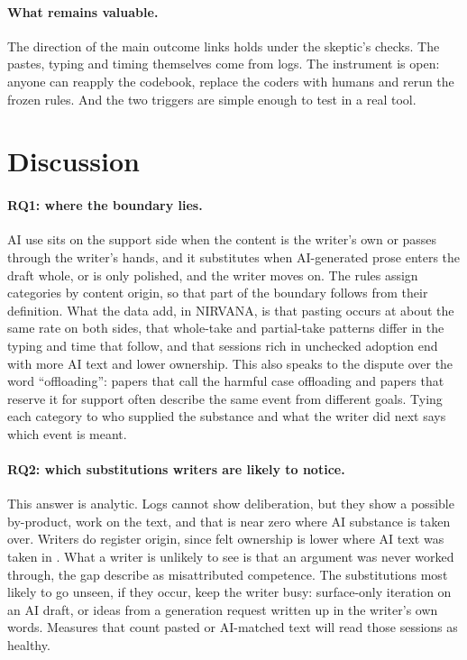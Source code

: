 \documentclass[manuscript,screen]{acmart}
\begin{document}
\paragraph{What remains valuable.} The direction of the main outcome links holds under the skeptic's checks. The pastes, typing and timing themselves come from logs. The instrument is open: anyone can reapply the codebook, replace the coders with humans and rerun the frozen rules. And the two triggers are simple enough to test in a real tool.

\section{Discussion}
\label{sec:discussion}

\paragraph{RQ1: where the boundary lies.} AI use sits on the support side when the content is the writer's own or passes through the writer's hands, and it substitutes when AI-generated prose enters the draft whole, or is only polished, and the writer moves on. The rules assign categories by content origin, so that part of the boundary follows from their definition. What the data add, in NIRVANA, is that pasting occurs at about the same rate on both sides, that whole-take and partial-take patterns differ in the typing and time that follow, and that sessions rich in unchecked adoption end with more AI text and lower ownership. This also speaks to the dispute over the word ``offloading'': papers that call the harmful case offloading \cite{alam2026,maier2026} and papers that reserve it for support \cite{shaw2026} often describe the same event from different goals. Tying each category to who supplied the substance and what the writer did next says which event is meant.

\paragraph{RQ2: which substitutions writers are likely to notice.} This answer is analytic. Logs cannot show deliberation, but they show a possible by-product, work on the text, and that is near zero where AI substance is taken over. Writers do register origin, since felt ownership is lower where AI text was taken in \cite{joshi2025}. What a writer is unlikely to see is that an argument was never worked through, the gap \citet{kim2026fallacy} describe as misattributed competence. The substitutions most likely to go unseen, if they occur, keep the writer busy: surface-only iteration on an AI draft, or ideas from a generation request written up in the writer's own words. Measures that count pasted or AI-matched text will read those sessions as healthy.
\end{document}
